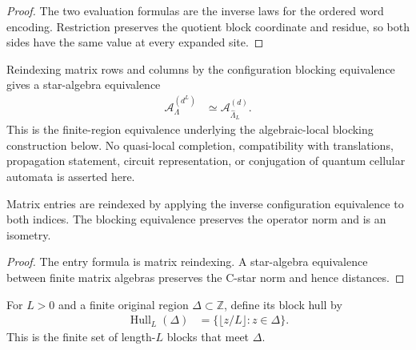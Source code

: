 \begin{proof}\leanok
    The two evaluation formulas are the inverse laws for the ordered word
    encoding.  Restriction preserves the quotient block coordinate and residue,
    so both sides have the same value at every expanded site.
\end{proof}

\begin{definition}
    \label{def:qca_local_blocking}
    \leanok
    Reindexing matrix rows and columns by the configuration blocking
    equivalence gives a star-algebra equivalence
    \begin{align}
        \mathcal A^{(d^L)}_\Lambda
         & \simeq \mathcal A^{(d)}_{\widehat\Lambda_L}.
    \end{align}
    This is the finite-region equivalence underlying the algebraic-local
    blocking construction below.  No quasi-local completion, compatibility
    with translations, propagation statement, circuit representation, or
    conjugation of quantum cellular automata is asserted here.
\end{definition}

\begin{lemma}
    \label{thm:qca_local_blocking_formulas}
    \leanok
    Matrix entries are reindexed by applying the inverse configuration
    equivalence to both indices.  The blocking equivalence preserves the
    operator norm and is an isometry.
\end{lemma}

\begin{proof}\leanok
    The entry formula is matrix reindexing.  A star-algebra equivalence between
    finite matrix algebras preserves the C-star norm and hence distances.
\end{proof}

\begin{definition}
    \label{def:qca_block_hull}
    \leanok
    For $L>0$ and a finite original region $\Delta\subset\mathbb Z$, define
    its block hull by
    \begin{align}
        \operatorname{Hull}_L(\Delta)
         & =\{\lfloor z/L\rfloor:z\in\Delta\}.
    \end{align}
    This is the finite set of length-$L$ blocks that meet $\Delta$.
\end{definition}

